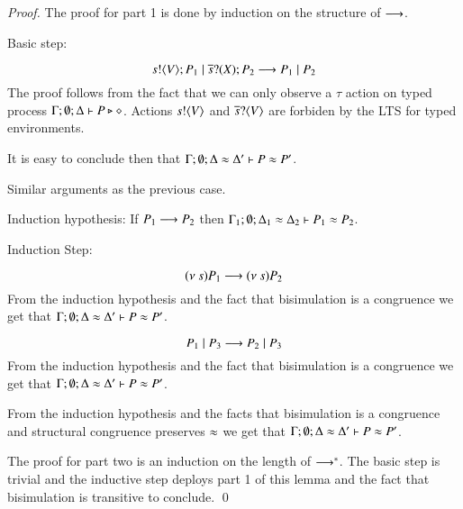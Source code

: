 \begin{proof}
	The proof for part 1 is done by induction on the structure of $\longrightarrow$.



%
%
	Basic step:

	\[
		s ! \langle V \rangle ; P_1 \;|\; \overline{s} ? (X) ; P_2 \longrightarrow P_1 \;|\; P_2
	\]
	The proof follows from the fact that we can only observe a $\tau$
	action on typed process
	$\Gamma; \emptyset; \Delta \vdash P \triangleright \diamond$.
	Actions $s ! \langle V \rangle$ and $\overline{s} ? \langle V \rangle$
	are forbiden by the LTS for typed environments.

	It is easy to conclude then that $\Gamma; \emptyset; \Delta \approx \Delta' \vdash P \approx P'$.


	Similar arguments as the previous case.

	Induction hypothesis:
	If $P_1 \longrightarrow P_2$ then
	$\Gamma_1; \emptyset; \Delta_1 \approx \Delta_2 \vdash P_1 \approx P_2$.

	Induction Step:

	\[
		(\nu\ s){P_1} \longrightarrow (\nu\ s) P_2
	\]
	From the induction hypothesis and the fact that bisimulation is a congruence
	we get that $\Gamma; \emptyset; \Delta \approx \Delta' \vdash P \approx P'$.


	\[
		P_1 \;|\; P_3 \longrightarrow P_2 \;|\; P_3
	\]
	From the induction hypothesis and the fact that bisimulation is a congruence
	we get that $\Gamma; \emptyset; \Delta \approx \Delta' \vdash P \approx P'$.


	From the induction hypothesis and the facts that bisimulation is a congruence
	and structural congruence preserves $\approx$
	we get that $\Gamma; \emptyset; \Delta \approx \Delta' \vdash P \approx P'$.


	The proof for part two is an induction on the length of $\longrightarrow^*$.
	The basic step is trivial and the inductive step
	deploys part 1 of this lemma and the fact that bisimulation is
	transitive to conclude.
	\qed
\end{proof}


